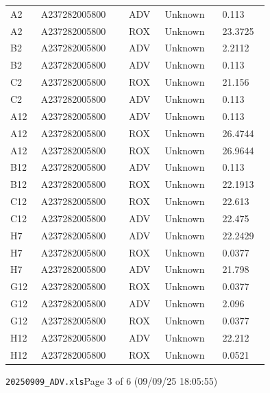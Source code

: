 \documentclass[UTF8,10pt,a4paper,fontset=fandol]{ctexart}
\begin{document}
\begin{center}
\small
\begin{tabular}{p{0.08\linewidth}p{0.28\linewidth}p{0.10\linewidth}p{0.17\linewidth}p{0.12\linewidth}}
A2 & A237282005800 & ADV & Unknown & 0.113 \\
A2 & A237282005800 & ROX & Unknown & 23.3725 \\
B2 & A237282005800 & ADV & Unknown & 2.2112 \\
B2 & A237282005800 & ADV & Unknown & 0.113 \\
C2 & A237282005800 & ROX & Unknown & 21.156 \\
C2 & A237282005800 & ADV & Unknown & 0.113 \\
A12 & A237282005800 & ADV & Unknown & 0.113 \\
A12 & A237282005800 & ROX & Unknown & 26.4744 \\
A12 & A237282005800 & ROX & Unknown & 26.9644 \\
B12 & A237282005800 & ADV & Unknown & 0.113 \\
B12 & A237282005800 & ROX & Unknown & 22.1913 \\
C12 & A237282005800 & ROX & Unknown & 22.613 \\
C12 & A237282005800 & ADV & Unknown & 22.475 \\
H7 & A237282005800 & ADV & Unknown & 22.2429 \\
H7 & A237282005800 & ROX & Unknown & 0.0377 \\
H7 & A237282005800 & ADV & Unknown & 21.798 \\
G12 & A237282005800 & ROX & Unknown & 0.0377 \\
G12 & A237282005800 & ADV & Unknown & 2.096 \\
G12 & A237282005800 & ROX & Unknown & 0.0377 \\
H12 & A237282005800 & ADV & Unknown & 22.212 \\
H12 & A237282005800 & ROX & Unknown & 0.0521 \\
\end{tabular}
\end{center}

\vfill

\noindent\texttt{20250909\_ADV.xls}\hfill Page 3 of 6 (09/09/25 18:05:55)

\newpage

\end{document}
